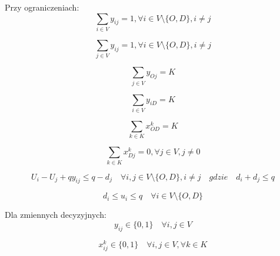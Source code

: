 \documentclass[a4paper, twoside, 12pt, justified]{article}
\begin{document}
	Przy ograniczeniach:\\
	\begin{equation}
	{\sum\limits_{i \in V}y_{ij} = 1, \forall i \in V \setminus \{O,D\}, i \neq j}
	\end{equation}
	
	\begin{equation}
	{\sum\limits_{j \in V}y_{ij} = 1, \forall i \in V \setminus \{O,D\}, i \neq j}
	\end{equation}
	
	\begin{equation}
	{\sum\limits_{j \in V}y_{Oj} = K}
	\end{equation}
	
	\begin{equation}
	{\sum\limits_{i \in V}y_{iD} = K}
	\end{equation}
	
	\begin{equation}
	{\sum\limits_{k \in K}x_{OD}^{k} = K}
	\end{equation}
	
	\begin{equation}
	{\sum\limits_{k \in K}x_{Dj}^{k} = 0, \forall j \in V, j \neq 0 }
	\end{equation}
	
	\begin{equation}
	{U_{i} - U_{j} + qy_{ij} \leq q - d_{j}  \quad  \forall i, j \in V \setminus \{O,D\}, i \neq j \quad gdzie \quad d_{i} + d_{j} \leq q}
	\end{equation}
	
	\begin{equation}
	{d_{i} \leq u_{i} \leq q \quad \forall i \in V \setminus \{O,D\} }
	\end{equation}
	
	Dla zmiennych decyzyjnych:\\
	
	\begin{equation}
	{ y_{ij} \in \{0,1\} \quad \forall i,j \in V }
	\end{equation}
	
	\begin{equation}
	{ x_{ij}^{k} \in \{0,1\} \quad \forall i,j \in V, \forall k \in K }
	\end{equation}
	
\end{document}
